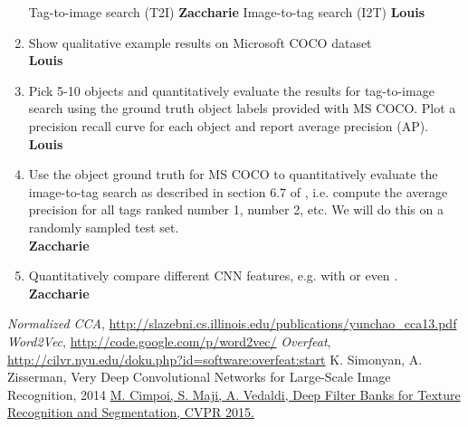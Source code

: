 \documentclass[a4paper,12pt]{article}
\begin{document}
\begin{enumerate}
    \subitem Tag-to-image search (T2I)
    \textbf{Zaccharie}
    \subitem Image-to-tag search (I2T)
    \textbf{Louis}
  \item Show qualitative example results on Microsoft COCO dataset
  \\\textbf{Louis}
  \item Pick 5-10 objects and quantitatively evaluate the results for tag-to-image search using the ground truth object labels provided with MS COCO. Plot a precision recall curve for each object and report average precision (AP).
  \\\textbf{Louis}
  \item Use the object ground truth for MS COCO to quantitatively evaluate the image-to-tag search as described in section 6.7 of \cite{normalizedcca}, i.e. compute the average precision for all tags ranked number 1, number 2, etc. We will do this on a randomly sampled test set.
  \\\textbf{Zaccharie}
  \item Quantitatively compare different CNN features, e.g. \cite{overfeat} with \cite{vgg} or even \cite{deepfilters}.
  \\\textbf{Zaccharie}

\end{enumerate}


\begin{thebibliography}{7}

  \emph{Normalized CCA},
  \url{http://slazebni.cs.illinois.edu/publications/yunchao\_cca13.pdf}
  \emph{Word2Vec},
  \url{http://code.google.com/p/word2vec/}
  \emph{Overfeat},
  \url{http://cilvr.nyu.edu/doku.php?id=software:overfeat:start}
  \href{http://arxiv.org/pdf/1409.1556.pdf}{}{
  K. Simonyan, A. Zisserman, Very Deep Convolutional Networks for Large-Scale Image Recognition, 2014
  }
  \href{http://www.robots.ox.ac.uk/~vgg/publications/2015/Cimpoi15/cimpoi15.pdf}{
  M. Cimpoi, S. Maji, A. Vedaldi, Deep Filter Banks for Texture Recognition and Segmentation, CVPR 2015.
  }
\end{thebibliography}
\end{document}
